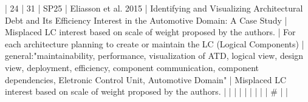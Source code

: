 | 24 |         31 | SP25 | Eliasson et al. 2015                                                 | Identifying and Visualizing Architectural Debt and Its Efficiency Interest in the Automotive Domain: A Case Study                                                        | Misplaced LC interest based on scale of weight proposed by the authors.                                                                                                                                                                                  | For each architecture planning to create or maintain the LC (Logical Components)                                                                                                                                                                                   | general:"maintainability, performance, visualization of ATD, logical view, design view, deployment, efficiency, component communication, component dependencies, Eletronic Control Unit, Automotive Domain"                                                                                              | Misplaced LC interest based on scale of weight proposed by the authors.                                                                                                                                                                                                                                                                                                                                                                                                                  |
|    |            |      |                                                                      |                                                                                                                                                                          |                                                                                                                                                                                                                                                            |                                                                                                                                                                                                                                                                      |  #                                                                                                                                                                                                                                                                                                       |                                                                                                                                                                                                                                                                                                                                                                                                                                                                                              |
